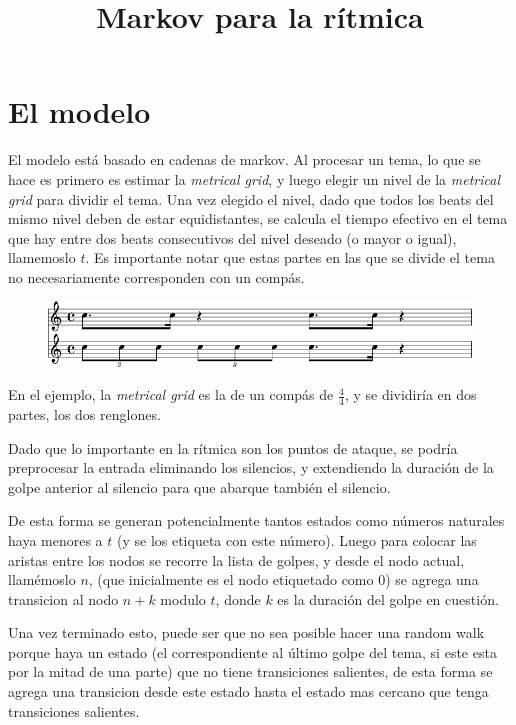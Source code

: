 \documentclass[a4paper,10pt]{article}
\title{Markov para la r\'itmica}
\begin{document}
\maketitle
\section{El modelo}
El modelo est\'a basado en cadenas de markov. Al procesar un tema, lo que se hace es primero es estimar la \emph{metrical 
grid}, y luego elegir un nivel de la \emph{metrical grid} para dividir el tema.
Una vez elegido el nivel, dado que todos los beats del mismo nivel deben de estar equidistantes, se calcula el 
tiempo efectivo en el tema que hay entre dos beats consecutivos del nivel deseado (o mayor o igual), llamemoslo $t$.
Es importante notar que estas partes en las que se divide el tema no necesariamente corresponden con un comp\'as.

\begin{figure}[h]
\begin{center}
\includegraphics[width=12cm]{images/reggae.png}
\label{fig:reggae}
\end{center}
\end{figure}

En el ejemplo, la \emph{metrical grid} es la de un comp\'as de $\frac{4}{4}$, y se dividir\'ia en dos partes, los dos renglones.

Dado que lo importante en la r\'itmica son los puntos de ataque, se podr\'ia preprocesar la entrada eliminando los silencios, y  
extendiendo la duraci\'on de la golpe anterior al silencio para que abarque tambi\'en el silencio.

De esta forma se generan potencialmente tantos estados como n\'umeros naturales haya menores a $t$ (y se los etiqueta con este n\'umero).
Luego para colocar las aristas entre los nodos se recorre la lista de golpes, y desde el nodo actual, llam\'emoslo
$n$, (que inicialmente es el nodo etiquetado como 0) se agrega una transicion al nodo $n+k$ modulo $t$,
donde $k$ es la duraci\'on del golpe en cuesti\'on.

Una vez terminado esto, puede ser que no sea posible hacer una random walk porque haya un estado (el correspondiente al \'ultimo golpe del tema, si 
este esta por la mitad de una parte) 
que no tiene transiciones salientes, de esta forma se agrega una transicion desde este estado hasta el estado mas cercano
que tenga transiciones salientes.
\end{document}
